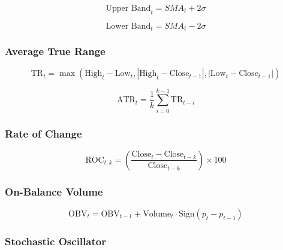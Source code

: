 \documentclass[journal]{new-aiaa}
\begin{document}
\cite{bollinger2002bollinger}

\begin{equation}
        \text{Upper Band}_t = SMA_t + 2\sigma
\end{equation}

\begin{equation}
        \text{Lower Band}_t = SMA_t - 2\sigma
\end{equation}

\subsubsection{Average True Range}\label{sec:Technical_Analysis:Average_True_Range}

\cite{wilder1978new}

\begin{equation}
        \text{TR}_t = \max\left(\text{High}_t - \text{Low}_t, \left|\text{High}_t - \text{Close}_{t-1}\right|, \left|\text{Low}_t - \text{Close}_{t-1}\right|\right)
\end{equation}

\begin{equation}\label{eq:Average_True_Range}
        \text{ATR}_t = \frac{1}{k} \sum_{i=0}^{k-1} \text{TR}_{t-i}
\end{equation}

\subsubsection{Rate of Change}\label{sec:Technical_Analysis:Rate_of_Change}

\begin{equation}
        \text{ROC}_{t,k} = \left(\frac{\text{Close}_{t} - \text{Close}_{t-k}}{\text{Close}_{t-k}}\right) \times 100
\end{equation}

\subsubsection{On-Balance Volume}\label{sec:Technical_Analysis:On_Balance_Volume}

\cite{granville1963new}

\begin{equation}
        \text{OBV}_t = \text{OBV}_{t-1} + \text{Volume}_t \cdot \text{Sign}\left(p_{t} - p_{t-1}\right)
\end{equation}

\subsubsection{Stochastic Oscillator}\label{sec:Technical_Analysis:Stochastic_Oscillator}
\end{document}
